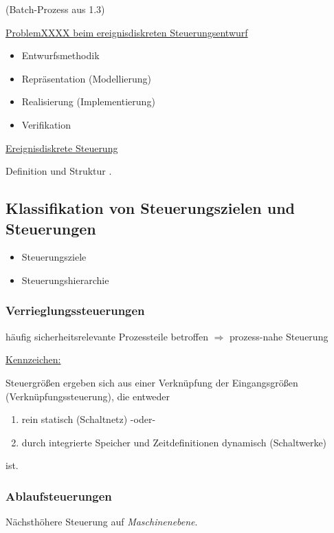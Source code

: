  (Batch-Prozess aus 1.3)

\underline{ProblemXXXX beim ereignisdiskreten Steuerungsentwurf}
\begin{itemize}
	\item Entwurfsmethodik
	\item Repräsentation (Modellierung)
	\item Realisierung (Implementierung)
	\item Verifikation
\end{itemize}

\underline{Ereignisdiskrete Steuerung}

Definition und Struktur .

\subsection{Klassifikation von Steuerungszielen und Steuerungen}
\begin{itemize}
	\item Steuerungsziele
	\item Steuerungshierarchie
\end{itemize}

\subsubsection{Verrieglungssteuerungen}\label{subsec:verr}
häufig sicherheitsrelevante Prozessteile betroffen $\Rightarrow$ prozess-nahe Steuerung



\underline{Kennzeichen:}

Steuergrößen ergeben sich aus einer Verknüpfung der Eingangsgrößen (Verknüpfungssteuerung), die entweder 
\begin{enumerate}[label=(\alph*)]
	\item rein statisch (Schaltnetz) -oder-
	\item durch integrierte Speicher und Zeitdefinitionen dynamisch (Schaltwerke)
\end{enumerate}
ist.

\subsubsection{Ablaufsteuerungen}
Nächsthöhere Steuerung auf \textit{Maschinenebene}.

